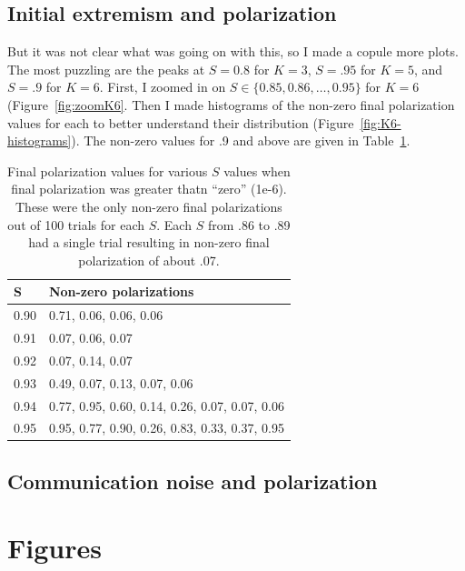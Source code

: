 \documentclass[11pt,letterpaper]{article}
\begin{document}
\subsection{Initial extremism and polarization}

But it was not clear what was going on with this, so I made a copule more
plots. The most puzzling are the peaks at $S=0.8$ for $K=3$, $S=.95$ for 
$K=5$, and $S=.9$ for
$K=6$. First, I zoomed in on $S \in \{0.85, 0.86, \ldots, 0.95\}$ for $K=6$
(Figure~\ref{fig:zoomK6}. Then I made histograms of the non-zero 
final polarization values for each to better understand their 
distribution (Figure~\ref{fig:K6-histograms}). The non-zero values for .9 and
above are given in Table~\ref{tab:nonzerosK6}.


\begin{table}
  \centering
  \begin{tabular}{ll}
    S & Non-zero polarizations \\
    \toprule 
    0.90 & 0.71, 0.06, 0.06, 0.06 \\
    0.91 & 0.07, 0.06, 0.07 \\
    0.92 & 0.07, 0.14, 0.07 \\
    0.93 & 0.49, 0.07, 0.13, 0.07, 0.06 \\
    0.94 & 0.77, 0.95, 0.60, 0.14, 0.26, 0.07, 0.07, 0.06 \\
    0.95 & 0.95, 0.77, 0.90, 0.26, 0.83, 0.33, 0.37, 0.95 \\
    \bottomrule
  \end{tabular}
  \caption{Final polarization values for various $S$ values when final 
  polarization was greater thatn ``zero'' (1e-6). These were the only 
  non-zero final polarizations out of 100 trials for each $S$. 
  Each $S$ from .86 to .89 had a single trial resulting in
  non-zero final polarization of about .07.}
  \label{tab:nonzerosK6}
\end{table}

\subsection{Communication noise and polarization}


\clearpage

\section{Figures}
\end{document}
